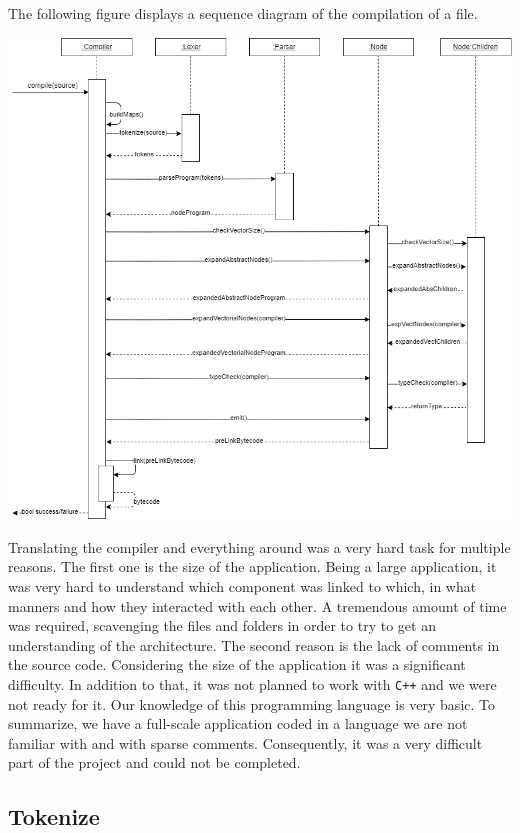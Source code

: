 \documentclass{scrreprt}
\begin{document}
The following figure displays a sequence diagram of the compilation of a file.

\begin{center}
  \includegraphics[width=\textwidth]{./compiler_sequence_diagram}
\end{center}

Translating the compiler and everything around was a very hard task for multiple reasons. The first one is the size of the application. Being a large application, it was very hard to understand which component was linked to which, in what manners and how they interacted with each other. A tremendous amount of time was required, scavenging the files and folders in order to try to get an understanding of the architecture.
The second reason is the lack of comments in the source code. Considering the size of the application it was a significant difficulty. In addition to that, it was not planned to work with \texttt{C++} and we were not ready for it. Our knowledge of this programming language is very basic. To summarize, we have a full-scale application coded in a language we are not familiar with and with sparse comments. 
Consequently, it was a very difficult part of the project and could not be completed. 

\subsection{Tokenize}
\end{document}
